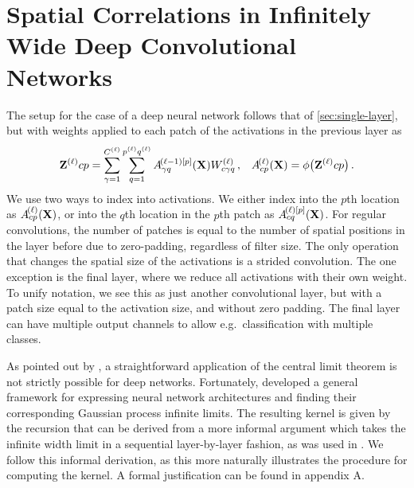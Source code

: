\documentclass{article}
\theoremstyle{definition}
\begin{document}
\section{Spatial Correlations in Infinitely Wide Deep Convolutional Networks\label{sec:correlated-weights}}
The setup for the case of a deep neural network follows that of \cref{sec:single-layer}, but with weights applied to each patch of the activations in the previous layer as
\begin{align}
    \mathbf{Z}^{(\ell)}{cp} = \sum_{\gamma=1}^{C^{(\ell)}}\sum_{q=1}^{p^{(\ell)}q^{(\ell)}} A^{\!(\ell-1)[p]}_{\gamma q}(\mathbf{X}) W^{(\ell)}_{c\gamma q} \,, && A^{\!(\ell)}_{cp}(\mathbf{X}) = \phi\big(\mathbf{Z}^{(\ell)}{cp}\big) \,. \label{eq:deep-recursion}
\end{align}
We use two ways to index into activations. We either index into the $p$th location as $A^{\!(\ell)}_{cp}(\mathbf{X})$, or into the $q$th location in the $p$th patch as $A^{\!(\ell)[p]}_{cq}(\mathbf{X})$. For regular convolutions, the number of patches is equal to the number of spatial positions in the layer before due to zero-padding, regardless of filter size. The only operation that changes the spatial size of the activations is a strided convolution. The one exception is the final layer, where we reduce all activations with their own weight. To unify notation, we see this as just another convolutional layer, but with a patch size equal to the activation size, and without zero padding. The final layer can have multiple output channels to allow e.g.~classification with multiple classes.

As pointed out by \citet{matthews2018dnnlimit}, a straightforward application of the central limit theorem is not strictly possible for deep networks. Fortunately, \citet{yang2019wide} developed a general framework for expressing neural network architectures and finding their corresponding Gaussian process infinite limits. The resulting kernel is given by the recursion that can be derived from a more informal argument which takes the infinite width limit in a sequential layer-by-layer fashion, as was used in \citet{garriga2018infiniteconv}. We follow this informal derivation, as this more naturally illustrates the procedure for computing the kernel. A formal justification can be found in appendix A.
\end{document}
